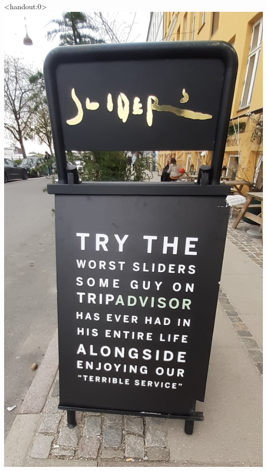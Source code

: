 \documentclass[english,10pt
,aspectratio=169
]{beamer}
\begin{document}
\begin{frame}<handout:0>
	\centering
	\includegraphics[scale=0.12]{pics/M8/sliders2}
\end{frame}


\end{document}
